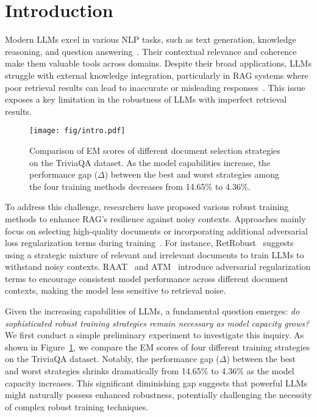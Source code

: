 \section{Introduction}
Modern LLMs excel in various NLP tasks, such as text generation, knowledge reasoning, and question answering~\cite{DBLP:conf/lkm/YeLZHJ24,tao-etal-2024-trust,DBLP:journals/corr/abs-2303-18223}. Their contextual relevance and coherence make them valuable tools across domains. Despite their broad applications, LLMs struggle with external knowledge integration, particularly in RAG systems where poor retrieval results can lead to inaccurate or misleading responses~\cite{xu-etal-2024-knowledge-conflicts,tan-etal-2024-blinded,DBLP:journals/corr/abs-2402-10612}. This issue exposes a key limitation in the robustness of LLMs with imperfect retrieval results.

\begin{figure}[t]
    \centering
    \texttt{[image: fig/intro.pdf]}
    \caption{Comparison of EM scores of different document selection strategies on the TriviaQA dataset. As the model capabilities increase, the performance gap ($\Delta$) between the best and worst strategies among the four training methods decreases from 14.65\% to 4.36\%.}
    \label{fig:intro}
    \vspace{-0.5cm}
\end{figure}

To address this challenge, researchers have proposed various robust training methods to enhance RAG's resilience against noisy contexts. Approaches mainly focus on selecting high-quality documents or incorporating additional adversarial loss regularization terms during training~\cite{DBLP:conf/iclr/YoranWRB24,fang-etal-2024-enhancing,DBLP:conf/icml/KruegerCJ0BZPC21,zhu-etal-2024-atm,jin-etal-2024-bider,DBLP:journals/corr/abs-2411-14572}. For instance, RetRobust~\cite{DBLP:conf/iclr/YoranWRB24} suggests using a strategic mixture of relevant and irrelevant documents to train LLMs to withstand noisy contexts. RAAT~\cite{fang-etal-2024-enhancing} and ATM~\cite{zhu-etal-2024-atm} introduce adversarial regularization terms to encourage consistent model performance across different document contexts, making the model less sensitive to retrieval noise. 

Given the increasing capabilities of LLMs, a fundamental question emerges: \textit{do sophisticated robust training strategies remain necessary as model capacity grows?} We first conduct a simple preliminary experiment to investigate this inquiry. As shown in Figure~\ref{fig:intro}, we compare the EM scores of four different training strategies on the TriviaQA dataset. Notably, the performance gap ($\Delta$) between the best and worst strategies shrinks dramatically from 14.65\% to 4.36\% as the model capacity increases. This significant diminishing gap suggests that powerful LLMs might naturally possess enhanced robustness, potentially challenging the necessity of complex robust training techniques.


